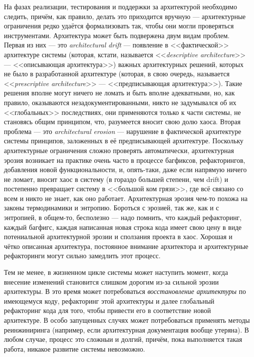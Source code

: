 \documentclass{../../text-style}
\begin{document}
На фазах реализации, тестирования и поддержки за архитектурой необходимо следить, причём, как правило, делать это приходится вручную --- архитектурные ограничения редко удаётся формализовать так, чтобы они могли проверяться инструментами. Архитектура может быть подвержена двум видам проблем. Первая из них --- это \emph{architectural drift} --- появление в <<фактической>> архитектуре системы (которая, кстати, называется <<\emph{descriptive architecture}>> --- <<описывающая архитектура>>) важных архитектурных решений, которых не было в разработанной архитектуре (которая, в свою очередь, называется <<\emph{prescriptive architecture}>> --- <<предписывающая архитектура>>). Такие решения вполне могут ничего не ломать и быть вполне адекватными, но, как правило, оказываются незадокументированными, никто не задумывался об их <<глобальных>> последствиях, они применяются только к части системы, не становясь общим принципом, что, разумеется вносит свою долю хаоса. Вторая проблема --- это \emph{architectural erosion} --- нарушение в фактической архитектуре системы принципов, заложенных в её предписывающей архитектуре. Поскольку архитектурные ограничения сложно проверять автоматически, архитектурная эрозия возникает на практике очень часто в процессе багфиксов, рефакторингов, добавления новой функциональности, и, опять-таки, даже если напрямую ничего не ломает, вносит хаос в систему (в гораздо большей степени, чем drift) и постепенно превращает систему в <<большой ком грязи>>, где всё связано со всем и никто не знает, как оно работает. Архитектурная эрозия чем-то похожа на законы термодинамики и энтропию. Бороться с эрозией, так же, как и с энтропией, в общем-то, бесполезно --- надо помнить, что каждый рефакторинг, каждый багфигс, каждая написанная новая строка кода имеет свою цену в виде потениальной архитектурной эрозии и сползания проекта в хаос. Хорошая и чётко описанная архитектура, постоянное внимание архитектора и архитектурные рефакторинги могут сильно замедлить этот процесс.

Тем не менее, в жизненном цикле системы может наступить момент, когда внесение изменений становится слишком дорогим из-за сильной эрозии архитектуры. В это время может потребоваться \emph{восстановление архитектуры} по имеющемуся коду, рефакторинг этой архитектуры и далее глобальный рефакторинг кода для того, чтобы привести его в соответствие новой архитектуре. В особо запущенных случях может потребоваться применять методы реинжиниринга (например, если архитектурная документация вообще утеряна). В любом случае, процесс это сложныи и долгий, причём, пока выполняется такая работа, никакое развитие системы невозможно.
\end{document}
